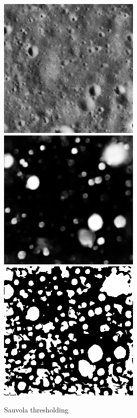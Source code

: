 \documentclass[11pt]{article}
\begin{document}
\begin{figure}[H]
	\includegraphics[width=.3\textwidth]{files/results/26.png}\hfill
	\includegraphics[width=.3\textwidth]{files/results/26_predict.png}\hfill
	\includegraphics[width=.3\textwidth]{files/results/sauvola.png}
	\caption{Sauvola thresholding}
	\label{sauvola thresholding}
\end{figure}
\end{document}
